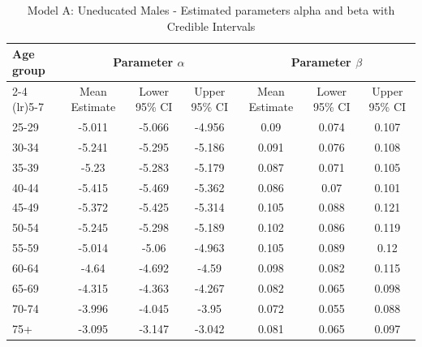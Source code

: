 \begin{landscape}
\begin{table}[htbp]
\centering
\caption{Model A: Uneducated Males - Estimated parameters alpha and beta  with Credible Intervals}
\label{tab:parameters_ab5}
\begin{tabular}{@{}lcccccc@{}}
\toprule
Age group & \multicolumn{3}{c}{Parameter \(\alpha\)} & \multicolumn{3}{c}{Parameter \(\beta\)} \\ 
\cmidrule(lr){2-4} \cmidrule(lr){5-7}
          & Mean Estimate & Lower 95\% CI & Upper 95\% CI & Mean Estimate & Lower 95\% CI & Upper 95\% CI \\ 
\midrule
25-29 & -5.011 & -5.066 & -4.956 & 0.09 & 0.074 & 0.107 \\
30-34 & -5.241 & -5.295 & -5.186 & 0.091 & 0.076 & 0.108 \\
35-39 & -5.23 & -5.283 & -5.179 & 0.087 & 0.071 & 0.105 \\
40-44 & -5.415 & -5.469 & -5.362 & 0.086 & 0.07 & 0.101 \\
45-49 & -5.372 & -5.425 & -5.314 & 0.105 & 0.088 & 0.121 \\
50-54 & -5.245 & -5.298 & -5.189 & 0.102 & 0.086 & 0.119 \\
55-59 & -5.014 & -5.06 & -4.963 & 0.105 & 0.089 & 0.12 \\
60-64 & -4.64 & -4.692 & -4.59 & 0.098 & 0.082 & 0.115 \\
65-69 & -4.315 & -4.363 & -4.267 & 0.082 & 0.065 & 0.098 \\
70-74 & -3.996 & -4.045 & -3.95 & 0.072 & 0.055 & 0.088 \\
75+ & -3.095 & -3.147 & -3.042 & 0.081 & 0.065 & 0.097 \\
\bottomrule
\end{tabular}
\end{table}
\end{landscape}